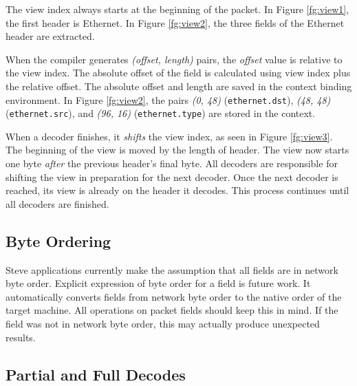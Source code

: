 The view index always starts at the beginning of the packet.
In Figure \ref{fg:view1}, the first header is Ethernet.
In Figure \ref{fg:view2}, the three fields of the Ethernet header
are extracted.

When the compiler generates \textit{(offset, length)} pairs,
the \emph{offset} value is relative to the view index. The
absolute offset of the field is calculated using view index plus
the relative offset.
The absolute offset and length are saved in the context binding environment.
In Figure \ref{fg:view2}, the pairs \textit{(0, 48)} (\texttt{ethernet.dst}),
\textit{(48, 48)} (\texttt{ethernet.src}), and \textit{(96, 16)} 
(\texttt{ethernet.type}) are stored in the context.


When a decoder finishes, it \textit{shifts} the view index, as seen in Figure
\ref{fg:view3}. The beginning of the view is moved by the length of header.
The view now starts one byte \textit{after} the previous header's final byte. 
All decoders are responsible for shifting the view in
preparation for the next decoder. Once the next decoder is reached, its view is
already on the header it decodes.
This process continues until all decoders are finished.

\subsection{Byte Ordering}

Steve applications currently make the assumption that all fields are in network byte order.
Explicit expression of byte order for a field is future work.
It automatically converts fields from network byte order
to the native order of the target machine. All operations on packet fields should keep this in mind.
If the field was not in network byte order, this may actually produce unexpected results.

\subsection{Partial and Full Decodes}

